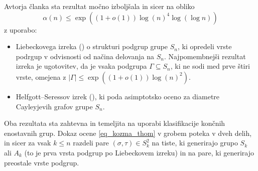 Avtorja članka \cite{Kozma_Thom_2016} sta rezultat močno izboljšala in sicer na obliko \begin{equation}\label{eq_kozma_thom}
    \alpha(n)  \le \exp((1 + o(1)) \log(n)^4 \log (\log n))
\end{equation}
z uporabo: 
\begin{itemize}
    \item Liebeckovega izreka (\cite{Liebeck_1984}) o strukturi podgrup grupe $S_n$, ki opredeli vrste podrgup v odvisnosti od načina delovanja na $S_n$. Najpomembnejši rezultat izreka je ugotovitev, da je vsaka podgrupa $\Gamma \subseteq  S_n$, ki ne sodi med prve štiri vrste, omejena z $\lvert \Gamma \rvert \le \exp((1 + o(1)) \log(n)^2)$. 
    \item Helfgott--Seressov izrek (\cite{Helfgott_Seress_2013}), ki poda asimptotsko oceno za diametre Cayleyjevih grafov grupe $S_n$.
\end{itemize} 
Oba rezultata sta zahtevna in temeljita na uporabi klasifikacije končnih enostavnih grup. Dokaz ocene \ref{eq_kozma_thom} v grobem poteka v dveh delih, in sicer za vsak $k \le n$ razdeli pare $(\sigma, \tau) \in S_k^2$ na tiste,
ki generirajo grupo $S_k$ ali $A_k$ (to je prva vrsta podgrup po Liebeckovem izreku) in na pare, ki generirajo preostale vrste podgrup.
